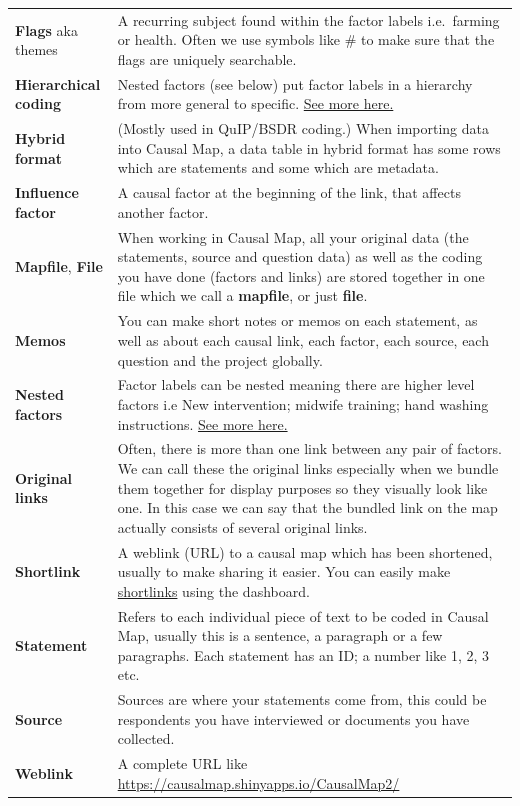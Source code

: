 \documentclass[
]{book}
\begin{document}
\begin{longtable}[]{@{}
  >{\raggedright\arraybackslash}p{}
  >{\raggedright\arraybackslash}p{}@{}}
\textbf{Flags} aka themes & A recurring subject found within the factor labels i.e.~farming or health. Often we use symbols like \# to make sure that the flags are uniquely searchable. \\
\textbf{Hierarchical coding} & Nested factors (see below) put factor labels in a hierarchy from more general to specific. \protect\hyperlink{simplifying}{See more here.} \\
\textbf{Hybrid format} & (Mostly used in QuIP/BSDR coding.) When importing data into Causal Map, a data table in hybrid format has some rows which are statements and some which are metadata. \\
\textbf{Influence factor} & A causal factor at the beginning of the link, that affects another factor. \\
\textbf{Mapfile}, \textbf{File} & When working in Causal Map, all your original data (the statements, source and question data) as well as the coding you have done (factors and links) are stored together in one file which we call a \textbf{mapfile}, or just \textbf{file}. \\
\textbf{Memos} & You can make short notes or memos on each statement, as well as about each causal link, each factor, each source, each question and the project globally. \\
\textbf{Nested factors} & Factor labels can be nested meaning there are higher level factors i.e New intervention; midwife training; hand washing instructions. \protect\hyperlink{simplifying}{See more here.} \\
\textbf{Original links} & Often, there is more than one link between any pair of factors. We can call these the original links especially when we bundle them together for display purposes so they visually look like one. In this case we can say that the bundled link on the map actually consists of several original links. \\
\textbf{Shortlink} & A weblink (URL) to a causal map which has been shortened, usually to make sharing it easier. You can easily make \protect\hyperlink{xsharing_view}{shortlinks} using the dashboard. \\
\textbf{Statement} & Refers to each individual piece of text to be coded in Causal Map, usually this is a sentence, a paragraph or a few paragraphs. Each statement has an ID; a number like 1, 2, 3 etc. \\
\textbf{Source} & Sources are where your statements come from, this could be respondents you have interviewed or documents you have collected. \\
\textbf{Weblink} & A complete URL like \url{https://causalmap.shinyapps.io/CausalMap2/} \\
\bottomrule()
\end{longtable}
\end{document}
